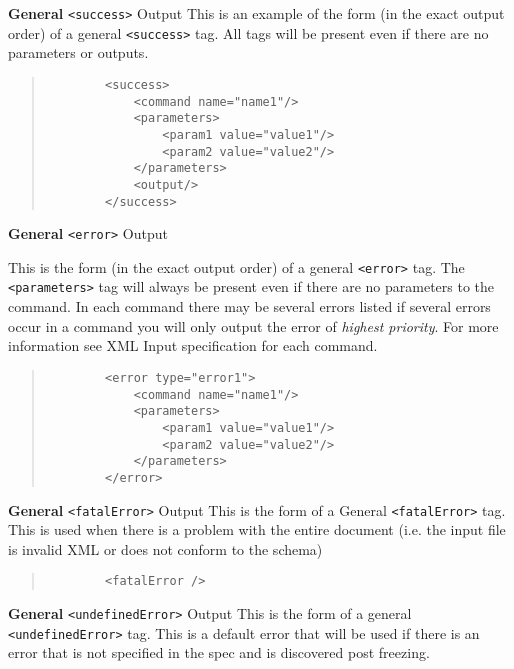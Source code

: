 \documentclass[12pt]{article}
\newenvironment{Description}
   {\begin{list}{}{\let\makelabel\Descriptionlabel
      \setlength\leftmargin{\labelwidth+\labelsep}
      \setlength\itemindent{-0.3em}}}%
   {\end{list}}
\newcommand*{\Descriptionlabel}[1]{%
  \parbox[b]{\labelwidth}
  {\makebox[0pt][l]{\textbf{#1}}\\}
  \hfill}
\begin{document}
 \begin{Description}

 	\item[\textbf{General} \texttt{<success>} Output]
	This is an example of the form (in the exact output order) of a general \texttt{<success>} tag. All tags will be present even if there are no parameters or outputs.
	\begin{quote}
	\begin{verbatim}
		<success>
		    <command name="name1"/>
		    <parameters>
		        <param1 value="value1"/>
		        <param2 value="value2"/>
		    </parameters>
		    <output/>
		</success>
	\end{verbatim}
	\end{quote}

	\item[\textbf{General} \texttt{<error>} Output]

	This is the form (in the exact output order) of a general \texttt{<error>} tag. The \texttt{<parameters>} tag will always be present even if there are no parameters to the command. In each command there may be several errors listed if several errors occur in a command you will only output the error of \emph{highest priority}. For more information see XML Input specification for each command.

	\begin{quote}
	\begin{verbatim}
		<error type="error1">
		    <command name="name1"/>
		    <parameters>
		        <param1 value="value1"/>
		        <param2 value="value2"/>
		    </parameters>
		</error>
	\end{verbatim}
	\end{quote}

	\item[\textbf{General} \texttt{<fatalError>} Output]
	This is the form of a General \texttt{<fatalError>} tag. This is used when there is a problem with the entire document (i.e. the input file is invalid XML or does not conform to the schema)

	\begin{quote}
	\begin{verbatim}
		<fatalError />
	\end{verbatim}
	\end{quote}
	
	\item[\textbf{General} \texttt{<undefinedError>} Output]
	This is the form of a general \texttt{<undefinedError>} tag. This is a default error that will be used if there is an error that is not specified in the spec and is discovered post freezing. 


\end{Description}
\end{document}
